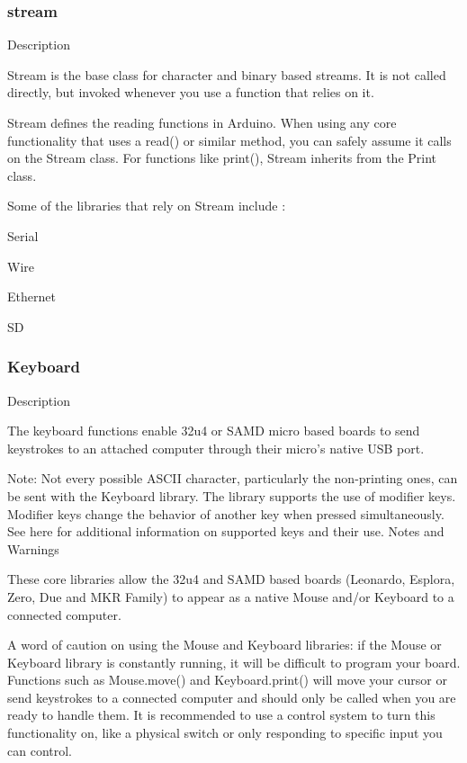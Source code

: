 \documentclass[12pt,a4paper]{report}  %
\begin{document}
\subsubsection{stream}\label{stream}


Description

Stream is the base class for character and binary based streams. It is not called directly, but invoked whenever you use a function that relies on it.

Stream defines the reading functions in Arduino. When using any core functionality that uses a read() or similar method, you can safely assume it calls on the Stream class. For functions like print(), Stream inherits from the Print class.

Some of the libraries that rely on Stream include :

    Serial

    Wire

    Ethernet

    SD

\subsubsection{Keyboard}\label{Keyboard}

Description

The keyboard functions enable 32u4 or SAMD micro based boards to send keystrokes to an attached computer through their micro’s native USB port.

Note: Not every possible ASCII character, particularly the non-printing ones, can be sent with the Keyboard library.
The library supports the use of modifier keys. Modifier keys change the behavior of another key when pressed simultaneously. See here for additional information on supported keys and their use.
Notes and Warnings

These core libraries allow the 32u4 and SAMD based boards (Leonardo, Esplora, Zero, Due and MKR Family) to appear as a native Mouse and/or Keyboard to a connected computer.

A word of caution on using the Mouse and Keyboard libraries: if the Mouse or Keyboard library is constantly running, it will be difficult to program your board. Functions such as Mouse.move() and Keyboard.print() will move your cursor or send keystrokes to a connected computer and should only be called when you are ready to handle them. It is recommended to use a control system to turn this functionality on, like a physical switch or only responding to specific input you can control.
\end{document}
